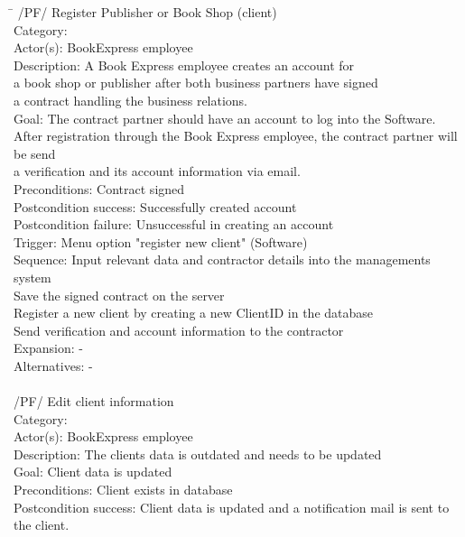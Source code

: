\documentclass[11pt,a4paper,oneside,svgnames,draft]{report}
\begin{document}
\begin{tabbing}
\hspace{3cm}\=\kill
	 /PF/ \> Register Publisher or Book Shop (client)\\ 
	 Category: \> \\
	 Actor(s): \> BookExpress employee\\ 
	 Description: \> A Book Express employee creates an account for\\ 
	 \> a book shop or publisher after both business partners have signed\\
	 \> a contract handling the business relations.\\
	 Goal: \> The contract partner should have an account to log into the Software.\\
	 \> After registration through the Book Express employee, the contract partner will be send\\
	 \> a verification and its account information via email.\\
	 Preconditions: \> Contract signed\\
	 Postcondition success: \> Successfully created account\\
	 Postcondition failure: \> Unsuccessful in creating an account\\
	 Trigger: \> Menu option "register new client" (Software)\\
	 Sequence: Input relevant data and contractor details into the managements system\\
	 \> Save the signed contract on the server\\
	 \> Register a new client by creating a new ClientID in the database\\
	 \> Send verification and account information to the contractor\\
	 Expansion: \> -\\
	 Alternatives: \> -\\
	 \\
	 /PF/ \> Edit client information\\ 
	 Category: \> \\
	 Actor(s): \> BookExpress employee\\ 
	 Description: \> The clients data is outdated and needs to be updated\\ 
	 Goal: \> Client data is updated\\
	 Preconditions: \> Client exists in database\\
	 Postcondition success: \> Client data is updated and a notification mail is sent to the client.\\

\end{tabbing}
\end{document}
